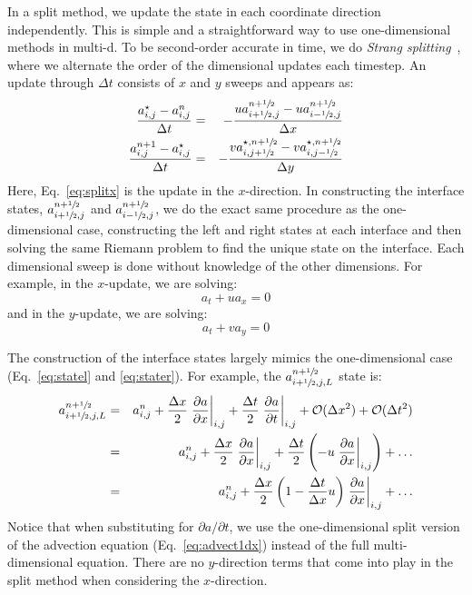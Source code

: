 In a split method, we update the state in each coordinate direction
independently.  This is simple and a straightforward way to use
one-dimensional methods in multi-d.  To be second-order accurate in
time, we do {\em Strang splitting}~\cite{strang}, where we alternate
the order of the dimensional updates each timestep.  An update through
$\Delta t$ consists of $x$ and $y$ sweeps and appears as:
\begin{eqnarray}
 \frac{a_{i,j}^\star - a_{i,j}^n}{\Delta t} &=&
  - \frac{ u a_{i+\sfrac{1}{2},j}^{n+\sfrac{1}{2}} - u a_{i-\sfrac{1}{2},j}^{n+\sfrac{1}{2}} }{\Delta x} \label{eq:splitx}\\
 \frac{a_{i,j}^{n+1} - a_{i,j}^\star}{\Delta t} &=&
  - \frac{ v a_{i,j+\sfrac{1}{2}}^{\star,n+\sfrac{1}{2}} - v a_{i,j-\sfrac{1}{2}}^{\star,n+\sfrac{1}{2}} }{\Delta y} \label{eq:splity}
\end{eqnarray}
Here, Eq.~\ref{eq:splitx} is the update in the $x$-direction.  In
constructing the interface states, $a_{i+\sfrac{1}{2},j}^{n+\sfrac{1}{2}}$ and
$a_{i-\sfrac{1}{2},j}^{n+\sfrac{1}{2}}$, we do the exact same procedure as the
one-dimensional case, constructing the left and right states at each
interface and then solving the same Riemann problem to find the unique
state on the interface.  Each dimensional sweep is done without
knowledge of the other dimensions.  For example, in the $x$-update, we
are solving:
\begin{equation}
a_t + u a_x = 0
\label{eq:advect1dx}
\end{equation}
and in the $y$-update, we are solving:
\begin{equation}
a_t + v a_y = 0
\end{equation}

The construction of the interface states largely mimics the one-dimensional
case (Eq.~\ref{eq:statel} and \ref{eq:stater}).  For example, the
$a_{i+\sfrac{1}{2},j,L}^{n+\sfrac{1}{2}}$ state is:
\begin{eqnarray}
a_{i+\sfrac{1}{2},j,L}^{n+\sfrac{1}{2}} &=& a_{i,j}^n + 
  \frac{\Delta x}{2} \left .\frac{\partial a}{\partial x} \right |_{i,j} + 
  \frac{\Delta t}{2} \left .\frac{\partial a}{\partial t} \right |_{i,j} + 
  \mathcal{O}(\Delta x^2) + \mathcal{O}(\Delta t^2) \nonumber \\
 &=& a_{i,j}^n + 
   \frac{\Delta x}{2} \left .\frac{\partial a}{\partial x} \right |_{i,j} + 
   \frac{\Delta t}{2} \left ( 
   - u \left .\frac{\partial a}{\partial x} \right |_{i,j} \right
   ) + \ldots \nonumber \\
    &=& a_{i,j}^n + 
   \frac{\Delta x}{2} \left ( 1 - \frac{\Delta t}{\Delta x} u \right ) 
   \left .\frac{\partial a}{\partial x} \right |_{i,j} +
   \ldots \label{eq:statels}
\end{eqnarray}
Notice that when substituting for $\partial a / \partial t$, we use
the one-dimensional split version of the advection equation
(Eq.~\ref{eq:advect1dx}) instead of the full multi-dimensional
equation.  There are no $y$-direction terms that come into play in the
split method when considering the $x$-direction.

